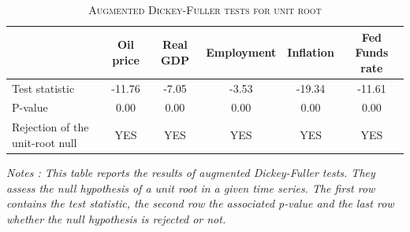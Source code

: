 \documentclass[11pt,a4paper]{article}
\begin{document}
%
\begin{table}[H] 
	\centering 
	\begin{threeparttable} 
		\caption{\textsc{Augmented Dickey-Fuller tests for unit root}} \label{tab:DF} 
		\begin{tabular*}{1.01 \textwidth }{lccccc} 
			\toprule \toprule  
			& \textbf{Oil price} & \textbf{Real GDP} & \textbf{Employment} & \textbf{Inflation} & \textbf{Fed Funds rate} \tabularnewline
			\midrule Test statistic                  &   -11.76 &    -7.05 &    -3.53 &   -19.34 &   -11.61 \\ 
			P-value                         &     0.00 &     0.00 &     0.00 &     0.00 &     0.00 \\ 
			Rejection of the unit-root null &     YES &     YES &     YES &     YES &     YES \\ 
			\bottomrule \bottomrule 
		\end{tabular*} 
		\begin{tablenotes} 
			\small 
			\item \emph{ \footnotesize{ Notes : 
					This table reports the results of augmented Dickey-Fuller tests. They assess the null hypothesis of a unit root in a given time series. The first row contains the test statistic, the second row the associated p-value and the last row whether the null hypothesis is rejected or not. } } 
		\end{tablenotes} 
	\end{threeparttable} 
\end{table} 
\end{document}

